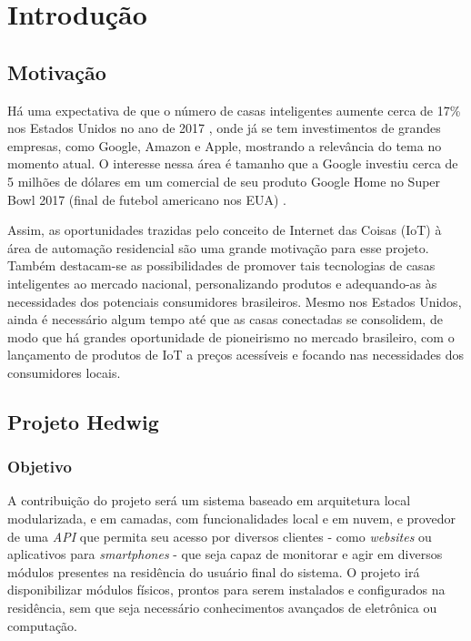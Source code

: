 \chapter{Introdução}

\section{Motivação}
Há uma expectativa de que o número de casas inteligentes aumente cerca de 17\% nos Estados Unidos no ano de 2017 \cite{mckinseyReport}, onde já se tem investimentos de grandes empresas, como Google, Amazon e Apple, mostrando a relevância do tema no momento atual. O interesse nessa área é tamanho que a Google investiu cerca de 5 milhões de dólares em um comercial de seu produto Google Home no Super Bowl 2017 (final de futebol americano nos EUA) \cite{kennemer}.

Assim, as oportunidades trazidas pelo conceito de Internet das Coisas (IoT) à área de automação residencial são uma grande motivação para esse projeto. Também destacam-se as possibilidades de promover tais tecnologias de casas inteligentes ao mercado nacional, personalizando produtos e adequando-as às necessidades dos potenciais consumidores brasileiros. Mesmo nos Estados Unidos, ainda é necessário algum tempo até que as casas conectadas se consolidem, de modo que há grandes oportunidade de pioneirismo no mercado brasileiro, com o lançamento de produtos de IoT a preços acessíveis e focando nas necessidades dos consumidores locais.

\section{Projeto Hedwig}

\subsection{Objetivo}
A contribuição do projeto será um sistema baseado em arquitetura local modularizada, e em camadas, com funcionalidades local e em nuvem, e provedor de uma \textit{API} que permita seu acesso por diversos clientes - como \textit{websites} ou aplicativos para \textit{smartphones} - que seja capaz de monitorar e agir em diversos módulos presentes na residência do usuário final do sistema. O projeto irá disponibilizar módulos físicos, prontos para serem instalados e configurados na residência, sem que seja necessário conhecimentos avançados de eletrônica ou computação.

